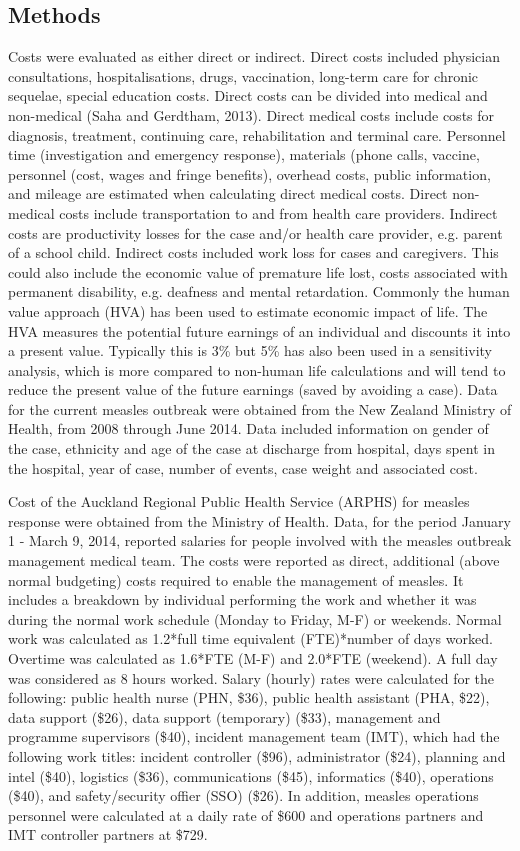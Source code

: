 \documentclass{article}
\begin{document}
\subsection{Methods}
Costs were evaluated as either direct or indirect. Direct costs included physician consultations, hospitalisations, drugs, vaccination, long-term care for chronic sequelae, special education costs. Direct costs can be divided into medical and non-medical (Saha and Gerdtham, 2013). Direct medical costs include costs for diagnosis, treatment, continuing care, rehabilitation and terminal care. Personnel time (investigation and emergency response), materials (phone calls, vaccine, personnel (cost, wages and fringe benefits), overhead costs, public information, and mileage are estimated when calculating direct medical costs. Direct non-medical costs include transportation to and from health care providers. 
Indirect costs are productivity losses for the case and/or health care provider, e.g. parent of a school child. Indirect costs included work loss for cases and caregivers. This could also include the economic value of premature life lost, costs associated with permanent disability, e.g. deafness and mental retardation. Commonly the human value approach (HVA) has been used to estimate economic impact of life. The HVA measures the potential future earnings of an individual and discounts it into a present value. Typically this is 3\% but 5\% has also been used in a sensitivity analysis, which is more compared to non-human life calculations and will tend to reduce the present value of the future earnings (saved by avoiding a case). 
Data for the current measles outbreak were obtained from the New Zealand Ministry of Health, from 2008 through June 2014. Data included information on gender of the case, ethnicity and age of the case at discharge from hospital, days spent in the hospital, year of case, number of events, case weight and associated cost.

Cost of the Auckland Regional Public Health Service (ARPHS) for measles response were obtained from the Ministry of Health. Data, for the period January 1 - March 9, 2014, reported salaries for people involved with the measles outbreak management medical team. The costs were reported as direct, additional (above normal budgeting) costs required to enable the management of measles. It includes a breakdown by individual performing the work and whether it was during the normal work schedule (Monday to Friday, M-F) or weekends. Normal work was calculated as 1.2*full time equivalent (FTE)*number of days worked. Overtime was calculated as 1.6*FTE (M-F) and 2.0*FTE (weekend). A full day was considered as 8 hours worked. Salary (hourly) rates were calculated for the following: public health nurse (PHN, \$36), public health assistant (PHA, \$22), data support (\$26), data support (temporary) (\$33), management and programme supervisors (\$40), incident management team (IMT), which had the following work titles: incident controller (\$96), administrator (\$24), planning and intel (\$40), logistics (\$36), communications (\$45), informatics (\$40), operations (\$40), and safety/security offier (SSO) (\$26). In addition, measles operations personnel were calculated at a daily rate of \$600 and operations partners and IMT controller partners at \$729.
\end{document}
